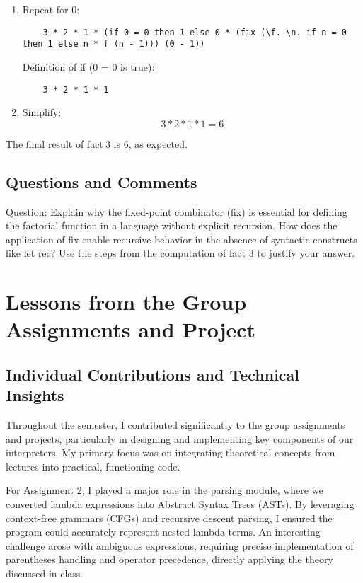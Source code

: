 \documentclass{article}
\theoremstyle{theorem}
\theoremstyle{definition}
\theoremstyle{remark}
\begin{document}
{\begin{enumerate}
    \item Repeat for $0$:
    \begin{lstlisting}
    3 * 2 * 1 * (if 0 = 0 then 1 else 0 * (fix (\f. \n. if n = 0 then 1 else n * f (n - 1))) (0 - 1))
    \end{lstlisting}
    Definition of if (0 = 0 is true):
    \begin{lstlisting}
    3 * 2 * 1 * 1
    \end{lstlisting}

    \item Simplify:
    \[
    3 * 2 * 1 * 1 = 6
    \]

\end{enumerate}

The final result of $\text{fact}~3$ is $6$, as expected.

\subsection*{Questions and Comments}
Question:
Explain why the fixed-point combinator (fix) is essential for defining the factorial function in a language without explicit recursion. How does the application of fix enable recursive behavior in the absence of syntactic constructs like let rec? Use the steps from the computation of fact 3 to justify your answer.



\section{Lessons from the Group Assignments and Project}
\label{group_lessons}

\subsection{Individual Contributions and Technical Insights}

Throughout the semester, I contributed significantly to the group assignments and projects, particularly in designing and implementing key components of our interpreters. My primary focus was on integrating theoretical concepts from lectures into practical, functioning code.

For Assignment 2, I played a major role in the parsing module, where we converted lambda expressions into Abstract Syntax Trees (ASTs). By leveraging context-free grammars (CFGs) and recursive descent parsing, I ensured the program could accurately represent nested lambda terms. An interesting challenge arose with ambiguous expressions, requiring precise implementation of parentheses handling and operator precedence, directly applying the theory discussed in class.

}
\end{document}
